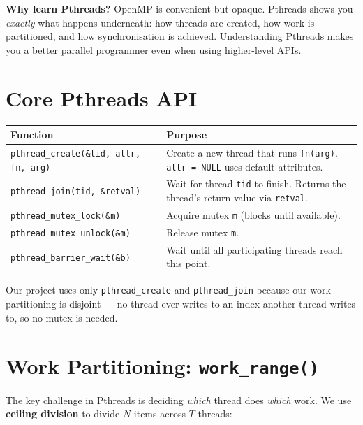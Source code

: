 \documentclass[12pt,a4paper]{article}
\begin{document}
\textbf{Why learn Pthreads?}  OpenMP is convenient but opaque.  Pthreads
shows you \emph{exactly} what happens underneath: how threads are created,
how work is partitioned, and how synchronisation is achieved.  Understanding
Pthreads makes you a better parallel programmer even when using higher-level
APIs.

\section{Core Pthreads API}

\begin{center}
\begin{tabular}{lp{9cm}}
\toprule
Function & Purpose \\
\midrule
\texttt{pthread\_create(\&tid, attr, fn, arg)} &
  Create a new thread that runs \texttt{fn(arg)}.
  \texttt{attr = NULL} uses default attributes. \\
\texttt{pthread\_join(tid, \&retval)} &
  Wait for thread \texttt{tid} to finish.
  Returns the thread's return value via \texttt{retval}. \\
\texttt{pthread\_mutex\_lock(\&m)} &
  Acquire mutex \texttt{m} (blocks until available). \\
\texttt{pthread\_mutex\_unlock(\&m)} &
  Release mutex \texttt{m}. \\
\texttt{pthread\_barrier\_wait(\&b)} &
  Wait until all participating threads reach this point. \\
\bottomrule
\end{tabular}
\end{center}

Our project uses only \texttt{pthread\_create} and \texttt{pthread\_join}
because our work partitioning is disjoint — no thread ever writes to an index
another thread writes to, so no mutex is needed.

\section{Work Partitioning: \texttt{work\_range()}}

The key challenge in Pthreads is deciding \emph{which} thread does
\emph{which} work.  We use \textbf{ceiling division} to divide $N$ items
across $T$ threads:
\end{document}

